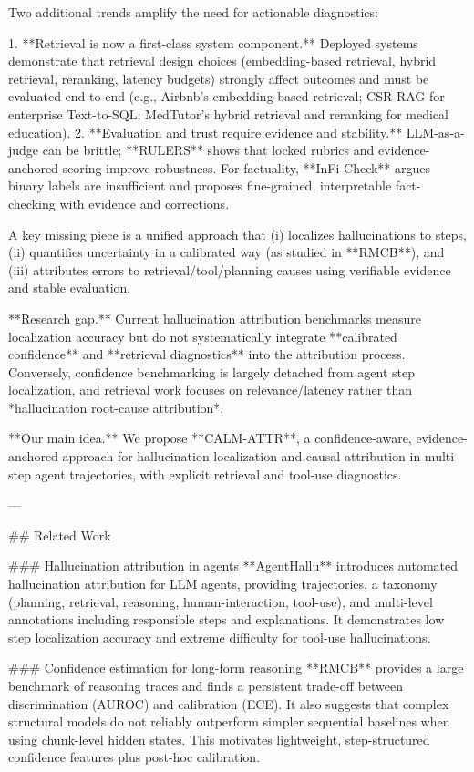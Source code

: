 Two additional trends amplify the need for actionable diagnostics:

1. **Retrieval is now a first-class system component.** Deployed systems demonstrate that retrieval design choices (embedding-based retrieval, hybrid retrieval, reranking, latency budgets) strongly affect outcomes and must be evaluated end-to-end (e.g., Airbnb’s embedding-based retrieval; CSR-RAG for enterprise Text-to-SQL; MedTutor’s hybrid retrieval and reranking for medical education).  
2. **Evaluation and trust require evidence and stability.** LLM-as-a-judge can be brittle; **RULERS** shows that locked rubrics and evidence-anchored scoring improve robustness. For factuality, **InFi-Check** argues binary labels are insufficient and proposes fine-grained, interpretable fact-checking with evidence and corrections.

A key missing piece is a unified approach that (i) localizes hallucinations to steps, (ii) quantifies uncertainty in a calibrated way (as studied in **RMCB**), and (iii) attributes errors to retrieval/tool/planning causes using verifiable evidence and stable evaluation.

**Research gap.** Current hallucination attribution benchmarks measure localization accuracy but do not systematically integrate **calibrated confidence** and **retrieval diagnostics** into the attribution process. Conversely, confidence benchmarking is largely detached from agent step localization, and retrieval work focuses on relevance/latency rather than *hallucination root-cause attribution*.  

**Our main idea.** We propose **CALM-ATTR**, a confidence-aware, evidence-anchored approach for hallucination localization and causal attribution in multi-step agent trajectories, with explicit retrieval and tool-use diagnostics.

---

## Related Work  

### Hallucination attribution in agents  
**AgentHallu** introduces automated hallucination attribution for LLM agents, providing trajectories, a taxonomy (planning, retrieval, reasoning, human-interaction, tool-use), and multi-level annotations including responsible steps and explanations. It demonstrates low step localization accuracy and extreme difficulty for tool-use hallucinations.

### Confidence estimation for long-form reasoning  
**RMCB** provides a large benchmark of reasoning traces and finds a persistent trade-off between discrimination (AUROC) and calibration (ECE). It also suggests that complex structural models do not reliably outperform simpler sequential baselines when using chunk-level hidden states. This motivates lightweight, step-structured confidence features plus post-hoc calibration.

